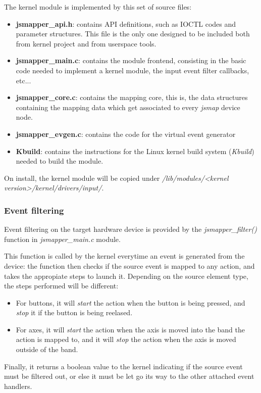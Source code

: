 The kernel module is implemented by this set of source files:
\begin{itemize}
	\item \textbf{jsmapper\_api.h}: contains API definitions, such as IOCTL codes and parameter structures. This file is the only one designed to be included both from kernel project and from userspace tools.
	\item \textbf{jsmapper\_main.c}: contains the module frontend, consisting in the basic code needed to implement a kernel module, the input event filter callbacks, etc...
	\item \textbf{jsmapper\_core.c}: contains the mapping core, this is, the data structures containing the mapping data which get associated to every \emph{jsmap} device node.
	\item \textbf{jsmapper\_evgen.c}: contains the code for the virtual event generator
	\item \textbf{Kbuild}: contains the instructions for the Linux kernel build system (\emph{Kbuild}) needed to build the module.
\end{itemize}
 
On install, the kernel module will be copied under \emph{/lib/modules/<kernel version>/kernel/drivers/input/}.

\subsubsection{Event filtering}
Event filtering on the target hardware device is provided by the \emph{jsmapper\_filter()} function in \emph{jsmapper\_main.c} module. 

This function is called by the kernel everytime an event is generated from the device: the function then checks if the source event is mapped to any action, and takes the appropiate steps to launch it. Depending on the source element type, the steps performed will be different:
\begin{itemize}
	\item For buttons, it will \emph{start} the action when the button is being pressed, and \emph{stop} it if the button is being reelased.
	\item For axes, it will \emph{start} the action when the axis is moved into the band the action is mapped to, and it will \emph{stop} the action when the axis is moved outside of the band. 
\end{itemize}

Finally, it returns a boolean value to the kernel indicating if the source event must be filtered out, or else it must be let go its way to the other attached event handlers.


